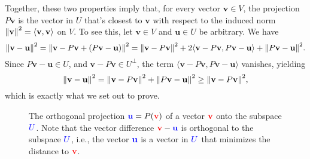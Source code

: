 Together, these two properties imply that, for every vector $\mathbf{v} \in V$, the projection $P \mathbf{v}$ is the vector in $U$ that's closest to $\mathbf{v}$ with respect to the induced norm $\norm{\mathbf{v}}^2 = \langle \mathbf{v}, \mathbf{v} \rangle$ on $V$. To see this, let $\mathbf{v} \in V$ and $\mathbf{u} \in U$ be arbitrary. We have
\[
    \norm{\mathbf{v} - \mathbf{u}}^2  = \norm{ \mathbf{v} - P \mathbf{v} + (P \mathbf{v} - \mathbf{u})}^2 = \norm{\mathbf{v} - P \mathbf{v}}^2 + 2 \langle \mathbf{v} - P \mathbf{v}, P \mathbf{v} - \mathbf{u} \rangle + \norm{P \mathbf{v} - \mathbf{u}}^2.
\]
Since $P \mathbf{v} - \mathbf{u} \in U$, and $\mathbf{v} - P \mathbf{v} \in U^{\bot}$, the term $\langle \mathbf{v} - P \mathbf{v}, P \mathbf{v} - \mathbf{u} \rangle$ vanishes, yielding
\[
    \norm{\mathbf{v} - \mathbf{u}}^2  = \norm{\mathbf{v} - P \mathbf{v}}^2 + \norm{P \mathbf{v} - \mathbf{u}}^2 \geq \norm{\mathbf{v} - P \mathbf{v}}^2,
\]
which is exactly what we set out to prove.

\begin{figure}
    \centering
    \caption{%
         The orthogonal projection ${\color{blue}\mathbf{u}} = P({\color{red}\mathbf{v}})$ of a vector ${\color{red}\mathbf{v}}$ onto the subspace ${\color{blue}U}$. Note that the vector difference ${\color{red}\mathbf{v}} - {\color{blue}\mathbf{u}}$ is orthogonal to the subspace ${\color{blue}U}$, i.e., the vector ${\color{blue}\mathbf{u}}$ is a vector in ${\color{blue}U}$ that minimizes the distance to ${\color{red}\mathbf{v}}$.
    }
    \label{fig: orthogonal-projection}
\end{figure}

